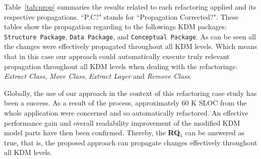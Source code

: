 Table~\ref{tab:prop} summaries the results related to each refactoring applied and its respective propagations. ``P.C?" stands for ``Propagation Corrected?". These tables show the propagation regarding to the followings KDM packages: \texttt{Structure Package}, \texttt{Data Package}, and \texttt{Conceptual Package}. As can be seen all the changes were effectively propagated throughout all KDM levels. Which means that in this case our approach could automatically execute truly relevant propagation throughout all KDM levels when dealing with the refactorings: \textit{Extract Class}, \textit{Move Class}, \textit{Extract Layer} and \textit{Remove Class}. 

Globally, the use of our approach in the context of this refactoring case study has been a success. As a result of the process, approximately 60 K SLOC from the whole application were concerned and so automatically refactored. An effective performance gain and overall readability improvement of the modified KDM model parts have then been confirmed. Thereby, the \textbf{RQ$_1$} can be answered as true, that is, the proposed approach can propagate changes effectively throughout all KDM levels.

